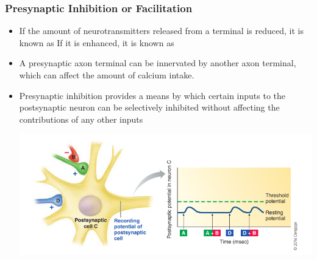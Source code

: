 \documentclass{article}
\numberwithin{equation}{section}
\begin{document}
\subsubsection{Presynaptic Inhibition or Facilitation}
\begin{itemize}
    \item If the amount of neurotransmitters released from a terminal is reduced, it is known as  If it is enhanced, it is known as 
    \item A presynaptic axon terminal can be innervated by another axon terminal, which can affect the amount of calcium intake.
    \item Presynaptic inhibition provides a means by which certain inputs to the postsynaptic neuron can be selectively inhibited without affecting the contributions of any other inputs
    \begin{center}
        \includegraphics[width=0.8\linewidth]{figures/presynaptic-inhibition.png}
    \end{center}
\end{itemize}
\end{document}
